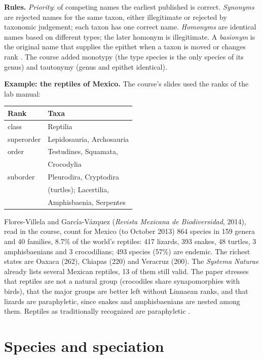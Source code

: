 \textbf{Rules.} \emph{Priority}: of
competing names the earliest published is
correct. \emph{Synonyms} are rejected
names for the same taxon, either
illegitimate or rejected by taxonomic
judgement; each taxon has one correct
name. \emph{Homonyms} are identical names
based on different types; the later
homonym is illegitimate. A
\emph{basionym} is the original name that
supplies the epithet when a taxon is moved
or changes rank
\cite[Chapter 16]{simpson2006plant}. The
course added monotypy (the type species is
the only species of its genus) and
tautonymy (genus and epithet identical).

\textbf{Example: the reptiles of
Mexico.} The course's slides used the
ranks of the lab manual:
\begin{center}
\begin{tabular}{ll}
Rank & Taxa \\
\hline
class & Reptilia \\
superorder & Lepidosauria, Archosauria \\
order & Testudines, Squamata, \\
 & Crocodylia \\
suborder & Pleurodira, Cryptodira \\
 & (turtles); Lacertilia, \\
 & Amphisbaenia, Serpentes
\end{tabular}
\end{center}
Flores-Villela and Garc\'ia-V\'azquez
(\emph{Revista Mexicana de
Biodiversidad}, 2014), read in the course,
count for Mexico (to October 2013) 864
species in 159 genera and 40 families,
8.7\% of the world's reptiles: 417
lizards, 393 snakes, 48 turtles, 3
amphisbaenians and 3 crocodilians; 493
species (57\%) are endemic. The richest
states are Oaxaca (262), Chiapas (220) and
Veracruz (200). The \emph{Systema
Naturae} already lists several Mexican
reptiles, 13 of them still valid. The
paper stresses that reptiles are not a
natural group (crocodiles share
synapomorphies with birds), that the major
groups are better left without Linnaean
ranks, and that lizards are paraphyletic,
since snakes and amphisbaenians are nested
among them. Reptiles as traditionally
recognized are paraphyletic
\cite[Chapter 4]{hickman2002animal}.

\section{Species and speciation}
\label{section-species}


